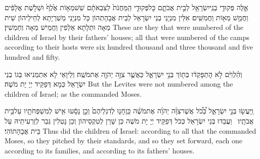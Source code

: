 {אֵ֛לֶּה פְּקוּדֵ֥י בְנֵֽי\maqqaf יִשְׂרָאֵ֖ל לְבֵ֣ית אֲבֹתָ֑ם כׇּל\maqqaf פְּקוּדֵ֤י הַֽמַּחֲנֹת֙ לְצִבְאֹתָ֔ם שֵׁשׁ\maqqaf מֵא֥וֹת אֶ֙לֶף֙ וּשְׁלֹ֣שֶׁת אֲלָפִ֔ים וַחֲמֵ֥שׁ מֵא֖וֹת וַחֲמִשִּֽׁים׃}
{אִלֵּין מִנְיָנֵי בְנֵי יִשְׂרָאֵל לְבֵית אֲבָהָתְהוֹן כָּל מִנְיָנֵי מַשְׁרְיָתָא לְחֵילֵיהוֹן שֵׁית מְאָה וּתְלָתָא אַלְפִין וַחֲמֵישׁ מְאָה וְחַמְשִׁין׃}
{These are they that were numbered of the children of Israel by their fathers’ houses; all that were numbered of the camps according to their hosts were six hundred thousand and three thousand and five hundred and fifty.}{}

{וְהַ֨לְוִיִּ֔ם לֹ֣א הׇתְפָּקְד֔וּ בְּת֖וֹךְ בְּנֵ֣י יִשְׂרָאֵ֑ל כַּאֲשֶׁ֛ר צִוָּ֥ה יְהֹוָ֖ה אֶת\maqqaf מֹשֶֽׁה׃}
{וְלֵיוָאֵי לָא אִתְמְנִיאוּ בְּגוֹ בְנֵי יִשְׂרָאֵל כְּמָא דְּפַקֵּיד יְיָ יָת מֹשֶׁה׃}
{But the Levites were not numbered among the children of Israel; as the \lord\space commanded Moses.}{}

{וַֽיַּעֲשׂ֖וּ בְּנֵ֣י יִשְׂרָאֵ֑ל כְּ֠כֹ֠ל אֲשֶׁר\maqqaf צִוָּ֨ה יְהֹוָ֜ה אֶת\maqqaf מֹשֶׁ֗ה כֵּֽן\maqqaf חָנ֤וּ לְדִגְלֵיהֶם֙ וְכֵ֣ן נָסָ֔עוּ אִ֥ישׁ לְמִשְׁפְּחֹתָ֖יו עַל\maqqaf בֵּ֥ית אֲבֹתָֽיו׃ \petucha }
{וַעֲבַדוּ בְּנֵי יִשְׂרָאֵל כְּכֹל דְּפַקֵּיד יְיָ יָת מֹשֶׁה כֵּן שָׁרַן לְטִקְסֵיהוֹן וְכֵן נָטְלִין גְּבַר לְזַרְעִיתֵיהּ עַל בֵּית אֲבָהָתוֹהִי׃}
{Thus did the children of Israel: according to all that the \lord\space commanded Moses, so they pitched by their standards, and so they set forward, each one according to its families, and according to its fathers’ houses.}{}

